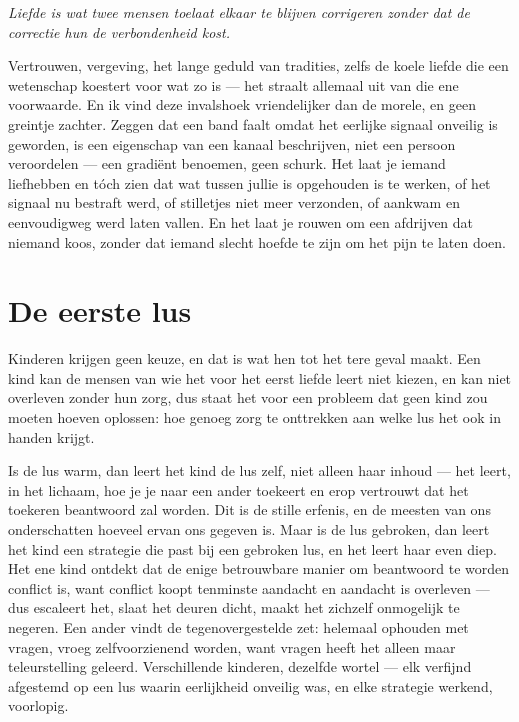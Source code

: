\documentclass[12pt, a4paper]{article}
\begin{document}
\begin{center}
\textit{Liefde is wat twee mensen toelaat elkaar te blijven corrigeren zonder dat de correctie hun de verbondenheid kost.}
\end{center}

Vertrouwen, vergeving, het lange geduld van tradities, zelfs de koele liefde die een wetenschap koestert voor wat zo is — het straalt allemaal uit van die ene voorwaarde. En ik vind deze invalshoek vriendelijker dan de morele, en geen greintje zachter. Zeggen dat een band faalt omdat het eerlijke signaal onveilig is geworden, is een eigenschap van een kanaal beschrijven, niet een persoon veroordelen — een gradiënt benoemen, geen schurk. Het laat je iemand liefhebben en tóch zien dat wat tussen jullie is opgehouden is te werken, of het signaal nu bestraft werd, of stilletjes niet meer verzonden, of aankwam en eenvoudigweg werd laten vallen. En het laat je rouwen om een afdrijven dat niemand koos, zonder dat iemand slecht hoefde te zijn om het pijn te laten doen.

\section*{De eerste lus}
Kinderen krijgen geen keuze, en dat is wat hen tot het tere geval maakt. Een kind kan de mensen van wie het voor het eerst liefde leert niet kiezen, en kan niet overleven zonder hun zorg, dus staat het voor een probleem dat geen kind zou moeten hoeven oplossen: hoe genoeg zorg te onttrekken aan welke lus het ook in handen krijgt.

Is de lus warm, dan leert het kind de lus zelf, niet alleen haar inhoud — het leert, in het lichaam, hoe je je naar een ander toekeert en erop vertrouwt dat het toekeren beantwoord zal worden. Dit is de stille erfenis, en de meesten van ons onderschatten hoeveel ervan ons gegeven is. Maar is de lus gebroken, dan leert het kind een strategie die past bij een gebroken lus, en het leert haar even diep. Het ene kind ontdekt dat de enige betrouwbare manier om beantwoord te worden conflict is, want conflict koopt tenminste aandacht en aandacht is overleven — dus escaleert het, slaat het deuren dicht, maakt het zichzelf onmogelijk te negeren. Een ander vindt de tegenovergestelde zet: helemaal ophouden met vragen, vroeg zelfvoorzienend worden, want vragen heeft het alleen maar teleurstelling geleerd. Verschillende kinderen, dezelfde wortel — elk verfijnd afgestemd op een lus waarin eerlijkheid onveilig was, en elke strategie werkend, voorlopig.
\end{document}
